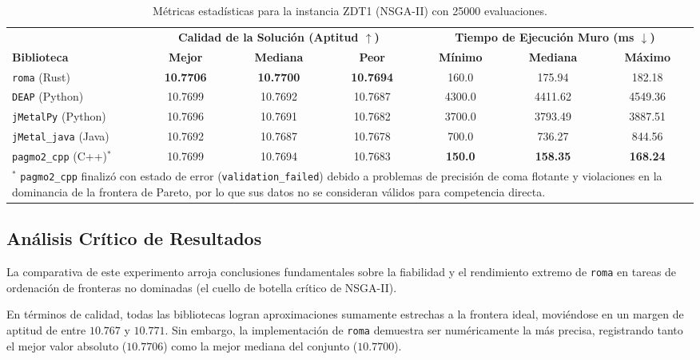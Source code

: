 \documentclass[12pt,a4paper,twoside,openright]{book}
\begin{document}
\begin{table}[htbp]
\centering
\small
\begin{tabular}{l ccc ccc}
\toprule
& \multicolumn{3}{c}{\textbf{Calidad de la Solución (Aptitud $\uparrow$)}} & \multicolumn{3}{c}{\textbf{Tiempo de Ejecución Muro (ms $\downarrow$)}} \\
\cmidrule(lr){2-4} \cmidrule(lr){5-7}
\textbf{Biblioteca} & \textbf{Mejor} & \textbf{Mediana} & \textbf{Peor} & \textbf{Mínimo} & \textbf{Mediana} & \textbf{Máximo} \\
\midrule
\texttt{roma} (Rust)         & \textbf{10.7706} & \textbf{10.7700} & \textbf{10.7694} & 160.0 & 175.94 & 182.18 \\
\texttt{DEAP} (Python)        & 10.7699 & 10.7692 & 10.7687 & 4300.0 & 4411.62 & 4549.36 \\
\texttt{jMetalPy} (Python)    & 10.7696 & 10.7691 & 10.7682 & 3700.0 & 3793.49 & 3887.51 \\
\texttt{jMetal\_java} (Java)  & 10.7692 & 10.7687 & 10.7678 & 700.0  & 736.27  & 844.56 \\
\texttt{pagmo2\_cpp} (C++)$^*$& 10.7699 & 10.7694 & 10.7683 & \textbf{150.0} & \textbf{158.35} & \textbf{168.24} \\
\bottomrule
\multicolumn{7}{p{0.9\textwidth}}{\scriptsize $^*$ \texttt{pagmo2\_cpp} finalizó con estado de error (\texttt{validation\_failed}) debido a problemas de precisión de coma flotante y violaciones en la dominancia de la frontera de Pareto, por lo que sus datos no se consideran válidos para competencia directa.}
\end{tabular}
\caption{Métricas estadísticas para la instancia ZDT1 (NSGA-II) con 25000 evaluaciones.}
\label{tab:resultados_zdt1}
\end{table}

\subsection{Análisis Crítico de Resultados}
    La comparativa de este experimento arroja conclusiones fundamentales sobre la fiabilidad y el rendimiento extremo de \texttt{roma} en tareas de ordenación de fronteras no dominadas (el cuello de botella crítico de NSGA-II).

    En términos de calidad, todas las bibliotecas logran aproximaciones sumamente estrechas a la frontera ideal, moviéndose en un margen de aptitud de entre $10.767$ y $10.771$. Sin embargo, la implementación de \texttt{roma} demuestra ser numéricamente la más precisa, registrando tanto el mejor valor absoluto ($10.7706$) como la mejor mediana del conjunto ($10.7700$).
\end{document}
